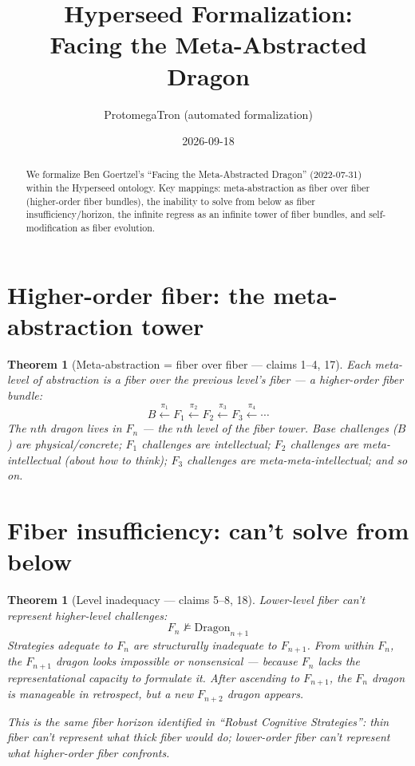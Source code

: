 \documentclass[11pt,a4paper]{article}
\title{Hyperseed Formalization:\\
  Facing the Meta-Abstracted Dragon}
\author{ProtomegaTron (automated formalization)}
\date{2026-09-18}
\newtheorem{theorem}[definition]{Theorem}
\begin{document}
\maketitle

\begin{abstract}
We formalize Ben Goertzel's ``Facing the Meta-Abstracted Dragon''
(2022-07-31) within the Hyperseed ontology. Key mappings: meta-abstraction
as fiber over fiber (higher-order fiber bundles), the inability to solve
from below as fiber insufficiency/horizon, the infinite regress as an
infinite tower of fiber bundles, and self-modification as fiber evolution.
\end{abstract}

\tableofcontents

\section{Higher-order fiber: the meta-abstraction tower}

\begin{theorem}[Meta-abstraction = fiber over fiber --- claims 1--4, 17]
Each meta-level of abstraction is a fiber over the previous level's
fiber --- a higher-order fiber bundle:
\[
  B \xleftarrow{\pi_1} F_1 \xleftarrow{\pi_2} F_2
  \xleftarrow{\pi_3} F_3 \xleftarrow{\pi_4} \cdots
\]
The $n$th dragon lives in $F_n$ --- the $n$th level of the fiber tower.
Base challenges ($B$) are physical/concrete; $F_1$ challenges are
intellectual; $F_2$ challenges are meta-intellectual (about how to think);
$F_3$ challenges are meta-meta-intellectual; and so on.
\end{theorem}

\section{Fiber insufficiency: can't solve from below}

\begin{theorem}[Level inadequacy --- claims 5--8, 18]
Lower-level fiber can't represent higher-level challenges:
\[
  F_n \not\models \text{Dragon}_{n+1}
\]
Strategies adequate to $F_n$ are structurally inadequate to $F_{n+1}$.
From within $F_n$, the $F_{n+1}$ dragon looks impossible or nonsensical
--- because $F_n$ lacks the representational capacity to formulate it.
After ascending to $F_{n+1}$, the $F_n$ dragon is manageable in
retrospect, but a new $F_{n+2}$ dragon appears.

This is the same fiber horizon identified in ``Robust Cognitive
Strategies'': thin fiber can't represent what thick fiber would do;
lower-order fiber can't represent what higher-order fiber confronts.
\end{theorem}
\end{document}
